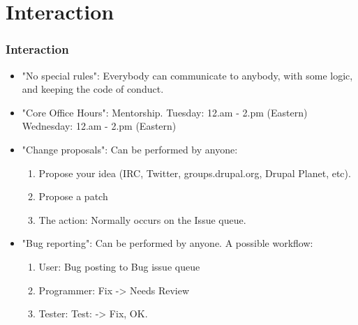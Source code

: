 \section{Interaction}
\begin{frame}[allowframebreaks]
\frametitle{Interaction}
\begin{itemize}
\item{"No special rules"}: Everybody can communicate to anybody, with some logic, and keeping the code of conduct.
\item{"Core Office Hours"}: Mentorship.
Tuesday: 12.am - 2.pm (Eastern)
Wednesday: 12.am - 2.pm (Eastern)
\item{"Change proposals"}: Can be performed by anyone:
\begin{enumerate}
\item Propose your idea (IRC, Twitter, groups.drupal.org, Drupal Planet, etc).
\item Propose a patch
\item The action: Normally occurs on the Issue queue. 
\end{enumerate}
\item{"Bug reporting"}: Can be performed by anyone. A possible workflow:
\begin{enumerate}
\item{User}: Bug posting to Bug issue queue
\item{Programmer}: Fix -> Needs Review
\item{Tester}: Test: -> Fix, OK.
\end{enumerate}
\end{itemize}
\end{frame}
